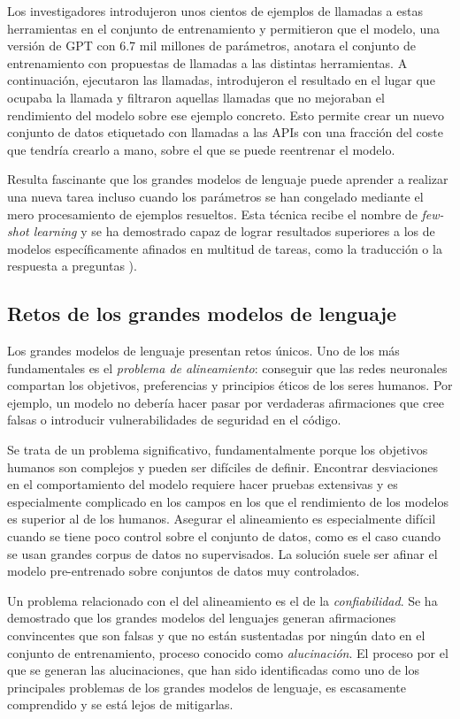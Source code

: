 Los investigadores introdujeron unos cientos de ejemplos de llamadas a estas herramientas en el conjunto de entrenamiento y permitieron que el modelo, una versión de GPT con 6.7 mil millones de parámetros, anotara el conjunto de entrenamiento con propuestas de llamadas a las distintas herramientas. A continuación, ejecutaron las llamadas, introdujeron el resultado en el lugar que ocupaba la llamada y filtraron aquellas llamadas que no mejoraban el rendimiento del modelo sobre ese ejemplo concreto. Esto permite crear un nuevo conjunto de datos etiquetado con llamadas a las APIs con una fracción del coste que tendría crearlo a mano, sobre el que se puede reentrenar el modelo.

Resulta fascinante que los grandes modelos de lenguaje puede aprender a realizar una nueva tarea incluso cuando los parámetros se han congelado mediante el mero procesamiento de ejemplos resueltos. Esta técnica recibe el nombre de \textit{few-shot learning} y se ha demostrado capaz de lograr resultados superiores a los de modelos específicamente afinados en multitud de tareas, como la traducción o la respuesta a preguntas \cite{brown2020language}).

\subsection{Retos de los grandes modelos de lenguaje}
Los grandes modelos de lenguaje presentan retos únicos. Uno de los más fundamentales es el \textit{problema de alineamiento}: conseguir que las redes neuronales compartan los objetivos, preferencias y principios éticos de los seres humanos. Por ejemplo, un modelo no debería hacer pasar por verdaderas afirmaciones que cree falsas o introducir vulnerabilidades de seguridad en el código.

Se trata de un problema significativo, fundamentalmente porque los objetivos humanos son complejos y pueden ser difíciles de definir. Encontrar desviaciones en el comportamiento del modelo requiere hacer pruebas extensivas y es especialmente complicado en los campos en los que el rendimiento de los modelos es superior al de los humanos. Asegurar el alineamiento es especialmente difícil cuando se tiene poco control sobre el conjunto de datos, como es el caso cuando se usan grandes corpus de datos no supervisados. La solución suele ser afinar el modelo pre-entrenado sobre conjuntos de datos muy controlados.

Un problema relacionado con el del alineamiento es el de la \textit{confiabilidad}. Se ha demostrado que los grandes modelos del lenguajes generan afirmaciones convincentes que son falsas y que no están sustentadas por ningún dato en el conjunto de entrenamiento, proceso conocido como \textit{alucinación}. El proceso por el que se generan las alucinaciones, que han sido identificadas como uno de los principales problemas de los grandes modelos de lenguaje, es escasamente comprendido y se está lejos de mitigarlas.


